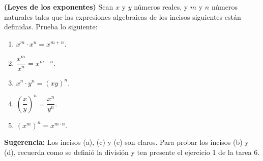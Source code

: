 \documentclass[12pt,a4paper]{article}
\begin{document}
    \thispagestyle{empty}
    

    \begin{problema}
        \textbf{(Leyes de los exponentes)} Sean $x$ y $y$ números reales, y $m$ y $n$ números naturales tales que las expresiones algebraicas de los incisos siguientes están definidas. Prueba lo siguiente:
        \begin{enumerate}
            \item[(a)] $x^{m}\cdot x^{n}=x^{m+n}.$
            \item[(b)] $\dfrac{x^{m}}{x^{n}}=x^{m-n}.$
            \item[(c)] $x^{n}\cdot y^{n}=(xy)^{n}.$
            \item[(d)] $\left(\dfrac{x}{y}\right)^{n}=\dfrac{x^{n}}{y^{n}}.$
            \item[(e)] $\left(x^{m}\right)^{n}=x^{m\cdot n}.$
        \end{enumerate}
        \textbf{Sugerencia:} Los incisos (a), (c) y (e) son claros. Para probar los incisos (b) y (d), recuerda como se definió la división y ten presente el ejercicio 1 de la tarea 6.
    \end{problema}
\end{document}
